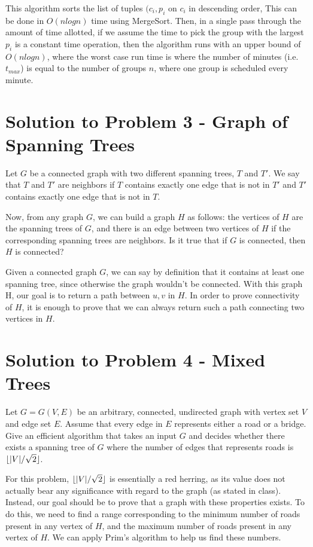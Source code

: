 \documentclass[11pt]{article}
\DeclarePairedDelimiter\floor{\lfloor}{\rfloor}
\begin{document}
This algorithm sorts the list of tuples $(c_i, p_i$ on $c_i$ in descending order, This can be done in $O(nlogn)$ time using MergeSort. Then, in a single pass through the amount of time allotted, if we assume the time to pick the group with the largest $p_i$ is a constant time operation, then the algorithm runs with an upper bound of $O(nlogn)$, where the worst case run time is where the number of minutes (i.e. $t_{max}$) is equal to the number of groups $n$, where one group is scheduled every minute.


\newpage


\section*{Solution to Problem 3 - Graph of Spanning Trees}

Let $G$ be a connected graph with two different spanning trees, $T$ and $T'$. We say that $T$ and $T'$ are neighbors if $T$ contains exactly one edge that is not in $T'$ and $T'$ contains exactly one edge that is not in $T$.

Now, from any graph $G$, we can build a graph $H$ as follows: the vertices of $H$ are the spanning trees of $G$, and there is an edge between two vertices of $H$ if the corresponding spanning trees are neighbors. Is it true that if $G$ is connected, then $H$ is connected?

Given a connected graph $G$, we can say by definition that it contains at least one spanning tree, since otherwise the graph wouldn't be connected. With this graph H, our goal is to return a path between $u, v$ in $H$. In order to prove connectivity of $H$, it is enough to prove that we can always return such a path connecting two vertices in $H$.

\newpage

\section*{Solution to Problem 4 - Mixed Trees}
 Let $G = G(V, E)$ be an arbitrary, connected, undirected graph with vertex set $V$ and edge set $E$. Assume that every edge in $E$ represents either a road or a bridge. Give an efficient algorithm that takes an input $G$ and decides whether there exists a spanning tree of $G$ where the number of edges that represents roads is $\floor{|V|/\sqrt{2}}$.
 
 For this problem, $\floor{|V|/\sqrt{2}}$ is essentially a red herring, as its value does not actually bear any significance with regard to the graph (as stated in class). Instead, our goal should be to prove that a graph with these properties exists. To do this, we need to find a range corresponding to the minimum number of roads present in any vertex of $H$, and the maximum number of roads present in any vertex of $H$. We can apply Prim's algorithm to help us find these numbers.
 
\end{document}

